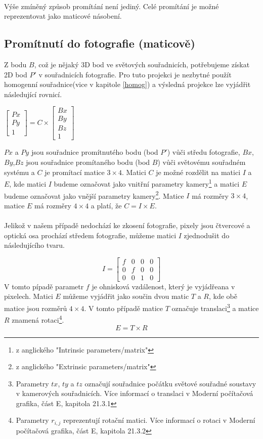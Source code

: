 \documentclass[11pt,twoside,a4paper]{book}
\begin{document}
\paragraph{}
Výše zmíněný způsob promítání není jediný. Celé promítání je možné reprezentovat jako maticové násobení.

\subsection{Promítnutí do fotografie (maticově)}
\label{promitaniMat}
Z bodu $B$, což je nějaký 3D bod ve světových souřadnicích, potřebujeme získat 2D bod $P'$ v souřadnicích fotografie. Pro tuto projekci je nezbytné použít homogenní souřadnice(vice v kapitole \ref{homog}) a výsledná projekce lze vyjádřit následující rovnicí.

$
\begin{bmatrix}
	Px \\
	Py \\
	1
\end{bmatrix}
=
C
\times
\begin{bmatrix}
Bx \\
By \\
Bz \\
1
\end{bmatrix}
$

$Px$ a $Py$ jsou souřadnice promítnutého bodu (bod $P'$) vůči středu fotografie, $Bx$,$By$,$Bz$ jsou souřadnice promítaného bodu (bod $B$) vůči světovému souřadném systému a $C$ je promítací matice $3\times4$. Matici $C$ je možné rozdělit na matici $I$ a $E$, kde matici $I$ budeme označovat jako vnitřní parametry kamery\footnote{z anglického "Intrinsic parameters/matrix"} a matici $E$ budeme označovat jako vnější parametry kamery\footnote{z anglického "Extrinsic parameters/matrix"}. Matice $I$ má rozměry $3\times4$, matice $E$ má rozměry $4\times4$ a platí, že $C = I \times E$.
\paragraph{}
Jelikož v našem případě nedochází ke zkosení fotografie, pixely jsou čtvercové a optická osa prochází středem fotografie, můžeme matici $I$ zjednodušit do následujícího tvaru.
 
 $$
 I
 =
 \begin{bmatrix}
 	f & 0 & 0 & 0 \\
 	0 & f & 0 & 0 \\
 	0 & 0 & 1 & 0
 \end{bmatrix}
 $$
 V tomto pípadě parametr $f$ je ohnisková vzdálenost, který je vyjádřeana v pixelech. Matici $E$ můžeme vyjádřit jako součin dvou matic $T$ a $R$, kde obě matice jsou rozměrů $4\times4$. V tomto případě matice $T$ označuje translaci\footnote{Parametry $tx$, $ty$ a $tz$ označují souřadnice počátku světové souřadné soustavy v kamerových souřadnicích.  Více informací o translaci v Moderní počítačová grafika\cite{Zara}, část E, kapitola 21.3.1} a matice $R$ znamená rotaci\footnote{Parametry $r_{i,j}$ reprezentují rotační matici. Více informací o rotaci v Moderní počítačová grafika\cite{Zara}, část E, kapitola 21.3.2}.
 $$
 E = T \times R
 $$
 
\end{document}
